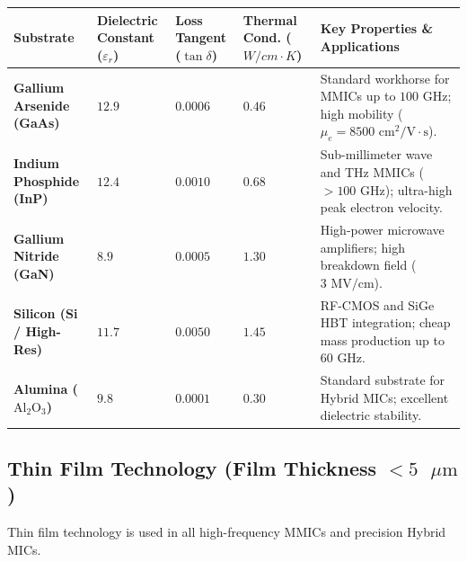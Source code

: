 \documentclass[10pt,a4paper]{article}
\begin{document}
\par\vspace{6pt}\noindent
\begingroup
\renewcommand{\arraystretch}{1.4}%
\begin{tabularx}{\linewidth}{|>{\raggedright\arraybackslash\bfseries}p{2.5cm}|>{\centering\arraybackslash}X|>{\centering\arraybackslash}X|>{\centering\arraybackslash}X|>{\raggedright\arraybackslash}X|}
\hline
\textbf{Substrate} & \textbf{Dielectric Constant ($\varepsilon_r$)} & \textbf{Loss Tangent ($\tan\delta$)} & \textbf{Thermal Cond. ($W/cm\cdot K$)} & \textbf{Key Properties \& Applications} \\
\hline
Gallium Arsenide (GaAs) & $12.9$ & $0.0006$ & $0.46$ & Standard workhorse for MMICs up to $100\text{ GHz}$; high mobility ($\mu_e = 8500\text{ cm}^2/\text{V}\cdot\text{s}$). \\
\hline
Indium Phosphide (InP) & $12.4$ & $0.0010$ & $0.68$ & Sub-millimeter wave and THz MMICs ($>100\text{ GHz}$); ultra-high peak electron velocity. \\
\hline
Gallium Nitride (GaN) & $8.9$ & $0.0005$ & $1.30$ & High-power microwave amplifiers; high breakdown field ($3\text{ MV/cm}$). \\
\hline
Silicon (Si / High-Res) & $11.7$ & $0.0050$ & $1.45$ & RF-CMOS and SiGe HBT integration; cheap mass production up to $60\text{ GHz}$. \\
\hline
Alumina ($\text{Al}_2\text{O}_3$) & $9.8$ & $0.0001$ & $0.30$ & Standard substrate for Hybrid MICs; excellent dielectric stability. \\
\hline
\end{tabularx}
\endgroup

\subsection{Thin Film Technology (Film Thickness \texorpdfstring{$< 5\text{ }\mu\text{m}$}{< 5 um})}
Thin film technology is used in all high-frequency MMICs and precision Hybrid MICs.
\end{document}
